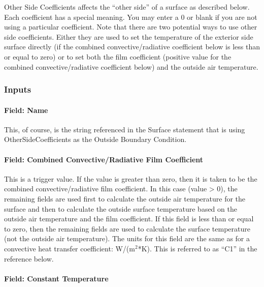 Other Side Coefficients affects the ``other side'' of a surface as described below. Each coefficient has a special meaning. You may enter a 0 or blank if you are not using a particular coefficient. Note that there are two potential ways to use other side coefficients. Either they are used to set the temperature of the exterior side surface directly (if the combined convective/radiative coefficient below is less than or equal to zero) or to set both the film coefficient (positive value for the combined convective/radiative coefficient below) and the outside air temperature.

\subsubsection{Inputs}\label{inputs-4}

\paragraph{Field: Name}\label{field-name-3}

This, of course, is the string referenced in the Surface statement that is using OtherSideCoefficients as the Outside Boundary Condition.

\paragraph{Field: Combined Convective/Radiative Film Coefficient}\label{field-combined-convectiveradiative-film-coefficient}

This is a trigger value. If the value is greater than zero, then it is taken to be the combined convective/radiative film coefficient. In this case (value \textgreater{} 0), the remaining fields are used first to calculate the outside air temperature for the surface and then to calculate the outside surface temperature based on the outside air temperature and the film coefficient. If this field is less than or equal to zero, then the remaining fields are used to calculate the surface temperature (not the outside air temperature). The units for this field are the same as for a convective heat transfer coefficient: W/(m\(^{2}\)*K). This is referred to as ``C1'' in the reference below.

\paragraph{Field: Constant Temperature}\label{field-constant-temperature}

